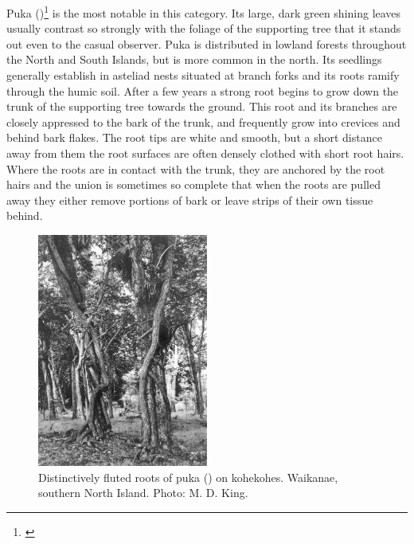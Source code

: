 Puka ()\footnote{\cite{dawson1966vegetative}} is the most notable in this category.
Its large, dark green shining leaves usually contrast so strongly with the foliage of the supporting tree that it stands out even to the casual observer.
Puka is distributed in lowland forests throughout the North and South Islands, but is more common in the north.
Its seedlings generally establish in asteliad nests situated at branch forks and its roots ramify through the humic soil.
After a few years a strong root begins to grow down the trunk of the supporting tree towards the ground.
This root and its branches are closely appressed to the bark of the trunk, and frequently grow into crevices and behind bark flakes.
The root tips are white and smooth, but a short distance away from them the root surfaces are often densely clothed with short root hairs.
Where the roots are in contact with the trunk, they are anchored by the root hairs and the union is sometimes so complete that when the roots are pulled away they either remove portions of bark or leave strips of their own tissue behind.

\begin{figure}
	\includegraphics[width=0.5\textwidth]{graphics/figure46puka-roots.jpg}
	\centering
	\caption[Distinctively fluted roots of puka on kohekohes]{Distinctively fluted roots of puka () on kohekohes.
	Waikanae, southern North Island.
	Photo: M. D. King.}%
	\label{fig:46puka-roots}
\end{figure}

